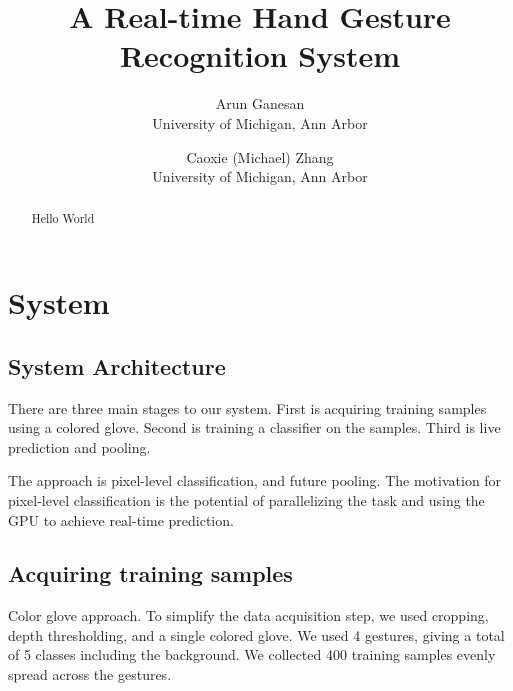 \documentclass[letterpaper,twocolumn,10pt]{article}
\begin{document}
\date{}

\title{\Large \bf A Real-time Hand Gesture Recognition System}

\author{
{\rm Arun Ganesan}\\
University of Michigan, Ann Arbor
\and
{\rm Caoxie (Michael) Zhang}\\
University of Michigan, Ann Arbor
} %

\maketitle

\thispagestyle{empty}

\begin{abstract}
Hello World
\end{abstract}



\section{System}
\subsection{System Architecture}
There are three main stages to our system. First is acquiring training samples using a colored glove. Second is training a classifier on the samples. Third is live prediction and pooling. 

The approach is pixel-level classification, and future pooling. The motivation for pixel-level classification is the potential of parallelizing the task and using the GPU to achieve real-time prediction. 

\subsection{Acquiring training samples}
Color glove approach. To simplify the data acquisition step, we used cropping, depth thresholding, and a single colored glove. We used 4 gestures, giving a total of 5 classes including the background. We collected 400 training samples evenly spread across the gestures.  
\end{document}

